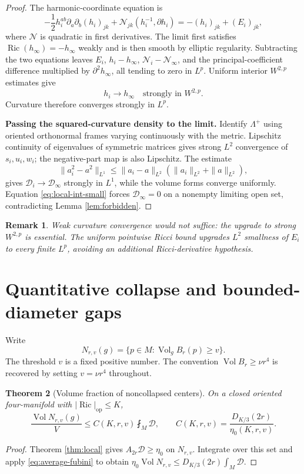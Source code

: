 \documentclass[a4paper,11pt]{article}
\theoremstyle{paper}
\newtheorem{theorem}{Theorem}[section]
\newtheorem{remark}[theorem]{Remark}
\DeclareMathOperator{\Ric}{Ric}
\DeclareMathOperator{\Vol}{Vol}
\newcommand{\op}{\mathrm{op}}
\newcommand{\av}{\fint}
\newcommand{\Dcal}{\mathcal D}
\numberwithin{equation}{section}
\begin{document}
\begin{proof}
The harmonic-coordinate equation is
\begin{equation}\label{eq:ricci-pde}
-\frac12h_i^{ab}\partial_a\partial_b(h_i)_{jk}
+\mathcal N_{jk}(h_i^{-1},\partial h_i)
=-(h_i)_{jk}+(E_i)_{jk},
\end{equation}
where $\mathcal N$ is quadratic in first derivatives. The limit first satisfies $\Ric(h_\infty)=-h_\infty$ weakly and is then smooth by elliptic regularity. Subtracting the two equations leaves $E_i$, $h_i-h_\infty$, $\mathcal N_i-\mathcal N_\infty$, and the principal-coefficient difference multiplied by $\partial^2h_\infty$, all tending to zero in $L^p$. Uniform interior $W^{2,p}$ estimates give
\[
h_i\longrightarrow h_\infty\quad\text{strongly in }W^{2,p}.
\]
Curvature therefore converges strongly in $L^p$.

\textbf{Passing the squared-curvature density to the limit.}
Identify $\Lambda^+$ using oriented orthonormal frames varying continuously with the metric. Lipschitz continuity of eigenvalues of symmetric matrices gives strong $L^2$ convergence of $s_i,u_i,w_i$; the negative-part map is also Lipschitz. The estimate
\[
\|a_i^2-a^2\|_{L^1}\le\|a_i-a\|_{L^2}(\|a_i\|_{L^2}+\|a\|_{L^2}),
\]
gives $\Dcal_i\to\Dcal_\infty$ strongly in $L^1$, while the volume forms converge uniformly. Equation \eqref{eq:local-int-small} forces $\Dcal_\infty=0$ on a nonempty limiting open set, contradicting Lemma \ref{lem:forbidden}.
\end{proof}

\begin{remark}
Weak curvature convergence would not suffice: the upgrade to strong $W^{2,p}$ is essential. The uniform pointwise Ricci bound upgrades $L^2$ smallness of $E_i$ to every finite $L^p$, avoiding an additional Ricci-derivative hypothesis.
\end{remark}

\section{Quantitative collapse and bounded-diameter gaps}

Write
\[
N_{r,v}(g)=\{p\in M:\Vol_gB_r(p)\ge v\}.
\]
The threshold $v$ is a fixed positive number. The convention $\Vol B_r\ge\nu r^4$ is recovered by setting $v=\nu r^4$ throughout.

\begin{theorem}[Volume fraction of noncollapsed centers]\label{thm:proportion}
On a closed oriented four-manifold with $|\Ric|_{\op}\le K$,
\begin{equation}\label{eq:proportion}
\frac{\Vol N_{r,v}(g)}V
\le C(K,r,v)\av_M\Dcal,
\qquad C(K,r,v)=\frac{D_{K/3}(2r)}{\eta_0(K,r,v)}.
\end{equation}
\end{theorem}
\begin{proof}
Theorem \ref{thm:local} gives $A_{2r}\Dcal\ge\eta_0$ on $N_{r,v}$. Integrate over this set and apply \eqref{eq:average-fubini} to obtain
$\eta_0\Vol N_{r,v}\le D_{K/3}(2r)\int_M\Dcal$.
\end{proof}
\end{document}
